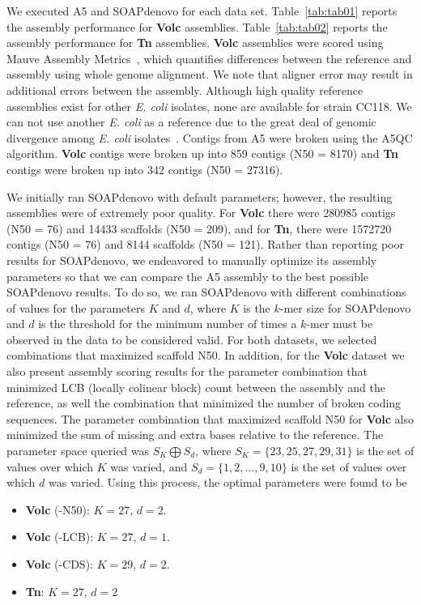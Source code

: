\documentclass[10pt]{article}
\begin{document}
We executed A5 and SOAPdenovo for each data set. Table~\ref{tab:tab01} reports the assembly performance for \textbf{Volc} assemblies.
Table~\ref{tab:tab02} reports the assembly performance for \textbf{Tn} assemblies. \textbf{Volc} assemblies were scored using Mauve Assembly 
Metrics~\cite{Darling2011}, which quantifies differences between the reference and assembly using whole genome alignment. We note that
aligner error may result in additional errors between the assembly. Although high quality reference assemblies exist for other \textit{E. coli} 
isolates, none are available for strain CC118. We can not use another \textit{E. coli} as a reference due to the great deal of genomic divergence
among \textit{E. coli} isolates~\cite{Perna2001}. Contigs from A5 were broken using the A5QC algorithm. 
\textbf{Volc} contigs were broken up into 859 contigs (N50 = 8170) and \textbf{Tn} contigs were broken up into 342 contigs (N50 = 27316). 

We initially ran SOAPdenovo with default parameters; however, the resulting assemblies were of extremely poor quality. For \textbf{Volc} there were
280985 contigs (N50 = 76) and 14433 scaffolds (N50 = 209), and for \textbf{Tn}, there were 1572720 contigs (N50 = 76) and 8144 scaffolds (N50 = 121). 
Rather than reporting poor results for SOAPdenovo, we endeavored to manually optimize its assembly parameters so that we can compare the A5 assembly
to the best possible SOAPdenovo results. 
To do so, we ran SOAPdenovo with different combinations of values for the parameters $K$ and $d$, where $K$ is the $k$-mer size for SOAPdenovo and $d$
is the threshold for the minimum number of times a $k$-mer must be observed in the data to be considered valid.
For both datasets, we selected combinations that maximized scaffold N50. In addition, for the \textbf{Volc} dataset we also present assembly scoring
results for the parameter combination that minimized LCB (locally colinear block) count between the assembly and the reference, as well the combination that minimized the
number of broken coding sequences. The parameter combination that maximized scaffold N50 for \textbf{Volc} also minimized the sum
of missing and extra bases relative to the reference. The parameter space queried was $S_K \bigoplus S_d$,
where $S_K = \{23,25,27,29,31\}$ is the set of values over which $K$ was varied, and $S_d = \{1,2,...,9,10\}$ is the set of values over which $d$
was varied. 
Using this process, the optimal parameters were found to be
\begin{itemize}
\item \textbf{Volc} (-N50): $K = 27$, $d = 2$.
\item \textbf{Volc} (-LCB): $K = 27$, $d = 1$.
\item \textbf{Volc} (-CDS): $K = 29$, $d = 2$.
\item \textbf{Tn}: $K = 27$, $d = 2$
\end{itemize}
\end{document}
